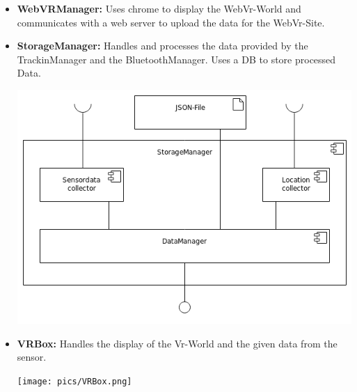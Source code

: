 \begin{itemize}
  \item \textbf{WebVRManager:} Uses chrome to display the WebVr-World and communicates with a web server to upload the data for the WebVr-Site.
  \item \textbf{StorageManager:} Handles and processes the data provided by the TrackinManager and the BluetoothManager. Uses a DB to store processed Data.
  \begin{center}
  	\includegraphics[scale=0.4]{pics/StorageMgr_Composition.png}
  \end{center}
  \item \textbf{VRBox:} Handles the display of the Vr-World and the given data from the sensor.
  \begin{center}
	\texttt{[image: pics/VRBox.png]}
  \end{center}
\end{itemize}


